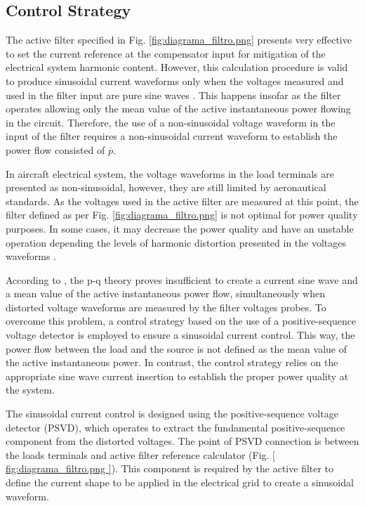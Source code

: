 
\subsection{Control Strategy}

The active filter specified in Fig. \ref{fig:diagrama_filtro.png} presents very effective to set the current reference at the compensator input for mitigation of the electrical system harmonic content. However, this calculation procedure is valid to produce sinusoidal current waveforms only when the voltages measured and used in the filter input are pure sine waves \citep{Akagi2007}. This happens insofar as the filter operates allowing only the mean value of the active instantaneous power flowing in the circuit. Therefore, the use of a non-sinusoidal voltage waveform in the input of the filter requires a non-sinusoidal current waveform to establish the power flow consisted of $\overline{p}$.

In aircraft electrical system, the voltage waveforms in the load terminals are presented as non-sinusoidal, however, they are still limited by aeronautical standards. As the voltages used in the active filter are measured at this point, the filter defined as per Fig. \ref{fig:diagrama_filtro.png} is not optimal for power quality purposes. In some cases, it may decrease the power quality and have an unstable operation depending the levels of harmonic distortion presented in the voltages waveforms \citep{Akagi2007}.

According to \citep{Akagi2007}, the p-q theory proves insufficient to create a current sine wave and a mean value of the active instantaneous power flow, simultaneously when distorted voltage waveforms are measured by the filter voltages probes. To overcome this problem, a control strategy based on the use of a positive-sequence voltage detector is employed to ensure a sinusoidal current control. This way, the power flow between the load and the source is not defined as the mean value of the active instantaneous power. In contrast, the control strategy relies on the appropriate sine wave current insertion to establish the proper power quality at the system.

The sinusoidal current control is designed using the positive-sequence voltage detector (PSVD), which operates to extract the fundamental positive-sequence component from the distorted voltages. The point of PSVD connection is between the loads terminals and active filter reference calculator (Fig. \ref{ fig:diagrama_filtro.png }). This component is required by the active filter to define the current shape to be applied in the electrical grid to create a sinusoidal waveform. 


